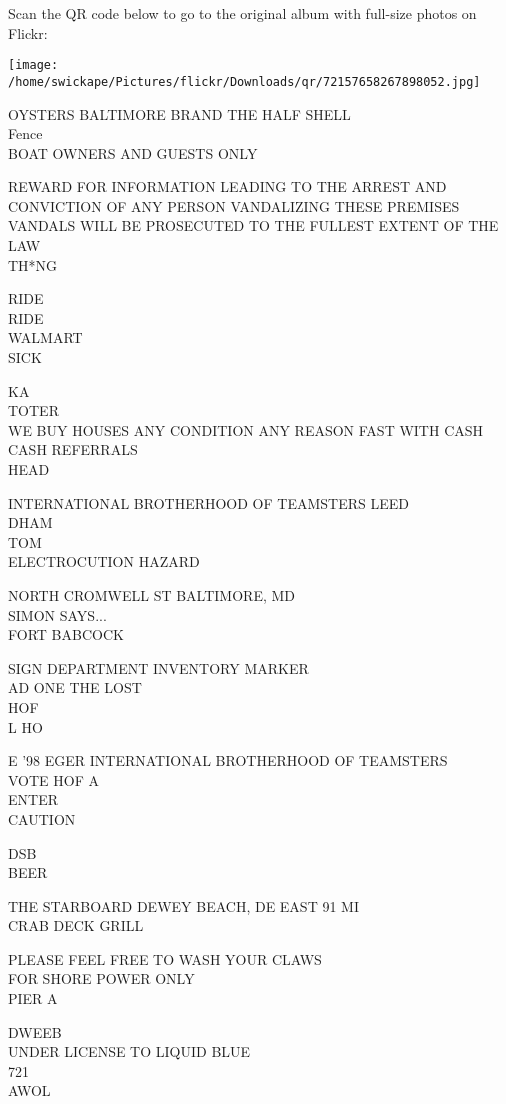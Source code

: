 \documentclass[10pt,letterpaper]{article}
\begin{document}
Scan the QR code below to go to the original album with full-size photos on Flickr:

\texttt{[image: /home/swickape/Pictures/flickr/Downloads/qr/72157658267898052.jpg]}


OYSTERS BALTIMORE BRAND THE HALF SHELL\\
Fence\\
BOAT OWNERS AND GUESTS ONLY

REWARD FOR INFORMATION LEADING TO THE ARREST AND CONVICTION OF ANY PERSON VANDALIZING THESE PREMISES VANDALS WILL BE PROSECUTED TO THE FULLEST EXTENT OF THE LAW\\
TH*NG

RIDE\\
RIDE\\
WALMART\\
SICK

KA\\
TOTER\\
WE BUY HOUSES ANY CONDITION ANY REASON FAST WITH CASH CASH REFERRALS\\
HEAD

INTERNATIONAL BROTHERHOOD OF TEAMSTERS LEED\\
DHAM\\
TOM\\
ELECTROCUTION HAZARD

NORTH CROMWELL ST BALTIMORE, MD\\
SIMON SAYS...\\
FORT BABCOCK

SIGN DEPARTMENT INVENTORY MARKER\\
AD ONE THE LOST\\
HOF\\
L HO

E '98 EGER INTERNATIONAL BROTHERHOOD OF TEAMSTERS\\
VOTE HOF A\\
ENTER\\
CAUTION

DSB\\
BEER

THE STARBOARD DEWEY BEACH, DE EAST 91 MI\\
CRAB DECK GRILL

PLEASE FEEL FREE TO WASH YOUR CLAWS\\
FOR SHORE POWER ONLY\\
PIER A

DWEEB\\
UNDER LICENSE TO LIQUID BLUE\\
721\\
AWOL
\end{document}
